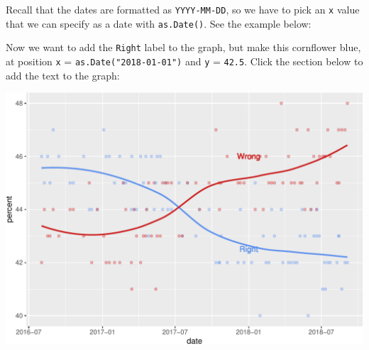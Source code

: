 \documentclass[letterpaper,12pt,twoside,]{pinp}
\begin{document}
Recall that the dates are formatted as \texttt{YYYY-MM-DD}, so we have
to pick an \texttt{x} value that we can specify as a date with
\texttt{as.Date()}. See the example below:

\begin{Shaded}
\begin{Highlighting}[]
\SpecialCharTok{+} 
  \NormalTok{(} \NormalTok{, } \NormalTok{, }
             \NormalTok{(}\NormalTok{), } \NormalTok{)}
\end{Highlighting}
\end{Shaded}

Now we want to add the \texttt{Right} label to the graph, but make this
cornflower blue, at position \texttt{x} = \texttt{as.Date("2018-01-01")}
and \texttt{y} = \texttt{42.5}. Click the section below to add the text
to the graph:

\begin{Shaded}
\begin{Highlighting}[]
\OtherTok{\textless{}{-}}\SpecialCharTok{+} 
  \NormalTok{(} \NormalTok{, } \NormalTok{, }
             \NormalTok{(}\NormalTok{), } \NormalTok{) }\SpecialCharTok{+} 
  \NormalTok{(} \NormalTok{, } \NormalTok{, }
             \NormalTok{(}\NormalTok{), } \NormalTok{)}
\end{Highlighting}
\end{Shaded}

\begin{center}\includegraphics{03-intro-to-ggplot2_files/figure-latex/ggp_brexit_global_colors_text-1} \end{center}
\end{document}
